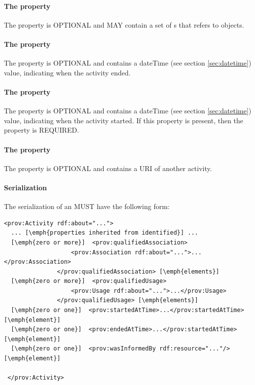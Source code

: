 {\paragraph{The  property}\label{sec:qualifiedUsage}
The  property is OPTIONAL and MAY contain a set of s that refers to  objects.

\paragraph{The  property}\label{sec:endedAtTime}
The  property is OPTIONAL and contains a dateTime (see section \ref{sec:datetime}) value, indicating when the activity ended.

\paragraph{The  property}\label{sec:startedAtTime}
The  property is OPTIONAL and contains a dateTime (see section \ref{sec:datetime}) value, indicating when the activity started.  If this property is present, then the  property is REQUIRED.

\paragraph{The  property}\label{sec:wasInformedBy}
The  property is OPTIONAL and contains a URI of another activity.

\paragraph{Serialization}
The serialization of an  MUST have the following form:
}

\begin{lstlisting}
<prov:Activity rdf:about="...">
  ... [\emph{properties inherited from identified}] ...
  [\emph{zero or more}]  <prov:qualifiedAssociation>
                   <prov:Association rdf:about="...">...</prov:Association>
               </prov:qualifiedAssociation> [\emph{elements}]
  [\emph{zero or more}]  <prov:qualifiedUsage>
                   <prov:Usage rdf:about="...">...</prov:Usage>
               </prov:qualifiedUsage> [\emph{elements}]             
  [\emph{zero or one}]  <prov:startedAtTime>...</prov:startedAtTime> [\emph{element}]
  [\emph{zero or one}]  <prov:endedAtTime>...</prov:startedAtTime> [\emph{element}] 
  [\emph{zero or one}]  <prov:wasInformedBy rdf:resource="..."/> [\emph{element}] 
 
 </prov:Activity>
\end{lstlisting}

